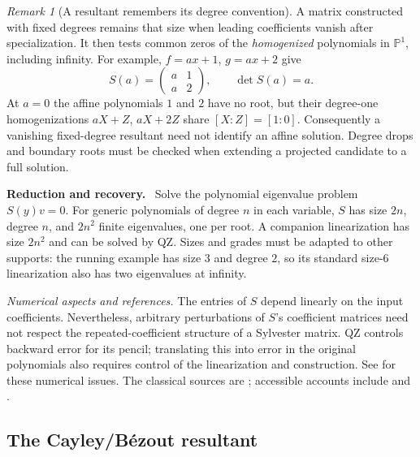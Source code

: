 \documentclass[12pt]{article}
\theoremstyle{definition}
\theoremstyle{remark}
\newtheorem{remark}[theorem]{Remark}
\newenvironment{reduction}
  {\par\medskip\noindent\textbf{Reduction and recovery.}\ }
  {\par\medskip}
\begin{document}
\begin{remark}[A resultant remembers its degree convention]\label{rem:sylvester-infinity}
  A matrix constructed with fixed degrees remains that size when leading
  coefficients vanish after specialization. It then tests common zeros of
  the \emph{homogenized} polynomials in $\mathbb P^1$, including infinity.
  For example, $f=ax+1$, $g=ax+2$ give
  \[
    S(a)=\begin{pmatrix}a&1\\a&2\end{pmatrix},\qquad\det S(a)=a.
  \]
  At $a=0$ the affine polynomials $1$ and $2$ have no root, but their
  degree-one homogenizations $aX+Z$, $aX+2Z$ share $[X:Z]=[1:0]$.
  Consequently a vanishing fixed-degree resultant need not identify an
  affine solution. Degree drops and boundary roots must be checked when
  extending a projected candidate to a full solution.
\end{remark}

\begin{reduction}
  Solve the polynomial eigenvalue problem $S(y)v=0$. For generic polynomials
  of degree $n$ in each variable, $S$ has size $2n$, degree $n$, and
  $2n^2$ finite eigenvalues, one per root. A companion linearization has
  size $2n^2$ and can be solved by QZ. Sizes and grades must be adapted to
  other supports: the running example has size $3$ and degree $2$, so its
  standard size-$6$ linearization also has two eigenvalues at infinity.
\end{reduction}

\emph{Numerical aspects and references.} The entries of $S$ depend linearly
on the input coefficients. Nevertheless, arbitrary perturbations of $S$'s
coefficient matrices need not respect the repeated-coefficient structure
of a Sylvester matrix. QZ controls backward error for its pencil; translating
this into error in the original polynomials also requires control of the
linearization and construction. See \cite{tisseur2000backward,
noferini2016numerical} for these numerical issues. The classical sources are
\cite{sylvester1840method,sylvester1853theory}; accessible accounts include
\cite[Ch.~3]{cox2005using} and \cite{sturmfels2002solving}.

\subsection{The Cayley/B\'ezout resultant}\label{sec:cayley}
\end{document}
